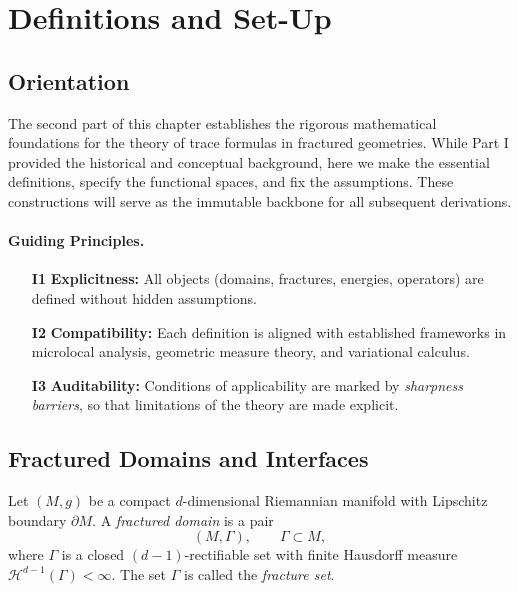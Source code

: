 
\section{Definitions and Set-Up}
\label{sec:definitions-setup}

\subsection*{Orientation}

The second part of this chapter establishes the rigorous mathematical
foundations for the theory of trace formulas in fractured geometries.
While Part I provided the historical and conceptual background, here
we make the essential definitions, specify the functional spaces,
and fix the assumptions. These constructions will serve as the
immutable backbone for all subsequent derivations.

\paragraph{Guiding Principles.}
\begin{itemize}
\item[\textbf{I1}] \textbf{Explicitness:} All objects (domains,
fractures, energies, operators) are defined without hidden assumptions.
\item[\textbf{I2}] \textbf{Compatibility:} Each definition is aligned
with established frameworks in microlocal analysis, geometric measure
theory, and variational calculus.
\item[\textbf{I3}] \textbf{Auditability:} Conditions of applicability
are marked by \emph{sharpness barriers}, so that limitations of the
theory are made explicit.
\end{itemize}

\bigskip


\subsection{Fractured Domains and Interfaces}

\begin{definition}
Let $(M,g)$ be a compact $d$-dimensional Riemannian manifold
with Lipschitz boundary $\partial M$. A \emph{fractured domain} is a pair
\[
(M,\Gamma), \qquad \Gamma \subset M,
\]
where $\Gamma$ is a closed $(d-1)$-rectifiable set with finite Hausdorff
measure $\mathcal{H}^{d-1}(\Gamma) < \infty$. The set $\Gamma$ is called
the \emph{fracture set}.
\end{definition}

